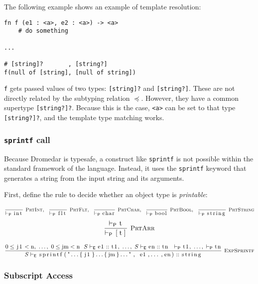 \documentclass{article}
\newcommand{\code}[1]{\lstinline[columns=fixed]{#1}}
\newcommand{\drmrule}[5]{\frac{#1}{#2\vdash_{\mathsf{#3}}#4}\textsc{\ \small{#5}}}
\newcommand{\ruleapp}[1]{\vdash_{\mathsf{#1}}}
\newcommand{\mc}[1]{\textnormal{\code{#1}}}
\begin{document}
				The following example shows an example of template resolution:
				
				\begin{lstlisting}
fn f (e1 : <a>, e2 : <a>) -> <a>
	# do something

...

# [string]?       , [string?]
f(null of [string], [null of string])
				\end{lstlisting}
				
				\code{f} gets passed values of two types: \code{[string]?} and \code{[string?]}. These are not directly related by the subtyping relation $\preceq$. However, they have a common supertype \code{[string?]?}. Because this is the case, \code{<a>} can be set to that type \code{[string?]?}, and the template type matching works.
				
			\subsubsection{\code{sprintf} call}
			
				Because Dromedar is typesafe, a construct like \code{sprintf} is not possible within the standard framework of the language. Instead, it uses the \code{sprintf} keyword that generates a string from the input string and its arguments.
				
				First, define the rule to decide whether an object type is \textit{printable}:
				
				\begin{align*}
					\drmrule{}{}{P}{\mc{int}}{PrtInt},\ \ 
					\drmrule{}{}{P}{\mc{flt}}{PrtFlt},\ \ 
					\drmrule{}{}{P}{\mc{char}}{PrtChar},\ \ 
					\drmrule{}{}{P}{\mc{bool}}{PrtBool},\ \ 
					\drmrule{}{}{P}{\mc{string}}{PrtString}
				\end{align*}\begin{align*}
					\drmrule{\ruleapp{P}\mc{t}}{}{P}{\mc{[t]}}{PrtArr}
				\end{align*}
				
				\begin{align*}
					\drmrule{0\leq\mc{j1}<\mc{n},\ \dots,\ 0\leq\mc{jm}<\mc{n}\ \ S\ruleapp{E}\mc{e1}::\mc{t1},\ \dots,\ S\ruleapp{E}\mc{en}::\mc{tn}\ \ \ruleapp{P}\mc{t1},\ \dots,\ \ruleapp{P}\mc{tn}}{S}{E}{\mc{sprintf("...\{j1\}...\{jm\}...", e1,...,en)} :: \mc{string}}{ExpSprintf}
				\end{align*}
				
			\subsubsection{Subscript Access}
			
\end{document}
